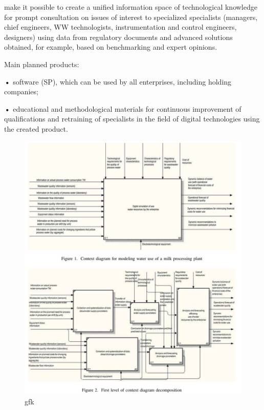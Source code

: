 \documentclass[a4paper, 10pt,twocolumn]{article}
\begin{document}
make it possible to create a unified information space
of technological knowledge for prompt consultation on
issues of interest to specialized specialists (managers,
chief engineers, WW technologists, instrumentation and
control engineers, designers) using data from regulatory
documents and advanced solutions obtained, for example, based on benchmarking and expert opinions.
\par Main planned products:
\par \textbf{•} software (SP), which can be used by all enterprises,
including holding companies;
\par \textbf{•} educational and methodological materials for continuous improvement of qualifications and retraining of
specialists in the field of digital technologies using
the created product.

\begin{figure}[h!]
    \centering
    \includegraphics[width=0.9\linewidth]{2024-09-04_17-41-53.png}
    \caption{gfk}
    \label{image}
\end{figure}
\end{document}
